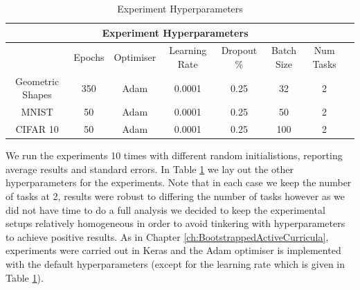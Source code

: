 \begin{table}[h!]
\caption{Experiment Hyperparameters} \label{tab:HyperParams2}
\hspace*{-2cm}
\begin{tabular}{|c||c|c|c|c|c|c|c|}
\hline
\multicolumn{7}{|c|}{Experiment Hyperparameters} \\
\hline
 &Epochs & Optimiser &Learning Rate & Dropout \% & Batch Size & Num Tasks\\
\hline
Geometric Shapes & 350 & Adam & 0.0001 & 0.25 & 32 & 2  \\
\hline
MNIST & 50 & Adam & 0.0001 & 0.25 & 50 & 2  \\
\hline
CIFAR 10 & 50 & Adam & 0.0001 & 0.25 & 100 & 2  \\
\hline
\end{tabular}
\end{table}
We run the experiments 10 times with different random initialistions, reporting average results and standard errors. In Table \ref{tab:HyperParams2} we lay out the other hyperparameters for the experiments. Note that in each case we keep the number of tasks at 2, results were robust to differing the number of tasks however as we did not have time to do a full analysis we decided to keep the experimental setups relatively homogeneous in order to avoid tinkering with hyperparameters to achieve positive results. As in Chapter \ref{ch:BootstrappedActiveCurricula}, experiments were carried out in Keras \cite{chollet2015keras} and the Adam optimiser is implemented with the default hyperparameters (except for the learning rate which is given in Table \ref{tab:HyperParams2}). 

